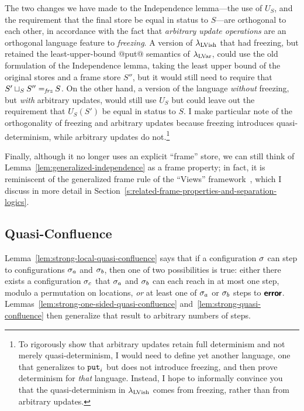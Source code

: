 \DefEqualStatus

The two changes we have made to the Independence lemma---the use of
$U_S$, and the requirement that the final store be equal in status to
$S$---are orthogonal to each other, in accordance with the fact that
\emph{arbitrary update operations} are an orthogonal language feature
to \emph{freezing}.  A version of $\lambda_{\textrm{LVish}}$ that had freezing,
but retained the least-upper-bound @put@ semantics of $\lambda_{\textrm{LVar}}$,
could use the old formulation of the Independence lemma, taking the
least upper bound of the original stores and a frame store $S''$, but
it would still need to require that $S' \sqcup_{S} S'' =_{\textit{frz}} S$.
On the other hand, a version of the language \emph{without} freezing,
but \emph{with} arbitrary updates, would still use $U_S$ but could
leave out the requirement that $U_S(S')$ be equal in status to $S$.  I
make particular note of the orthogonality of freezing and arbitrary
updates because freezing introduces quasi-determinism, while arbitrary
updates do not.\footnote{To rigorously show that arbitrary updates
  retain full determinism and not merely quasi-determinism, I would
  need to define yet another language, one that generalizes 
  to $\mbox{\texttt{put}}_i$ but does not introduce freezing, and then prove
  determinism for \emph{that} language.  Instead, I hope to informally
  convince you that the quasi-determinism in $\lambda_{\textrm{LVish}}$ comes from
  freezing, rather than from arbitrary updates.}

Finally, although it no longer uses an explicit ``frame'' store, we
can still think of Lemma~\ref{lem:generalized-independence} as a frame
property; in fact, it is reminiscent of the generalized frame rule of
the ``Views'' framework~\cite{views}, which I discuss in more detail
in Section~\ref{s:related-frame-properties-and-separation-logics}.

\subsection{Quasi-Confluence}\label{subsection:quasi-quasi-confluence}

Lemma~\ref{lem:strong-local-quasi-confluence} says that if a
configuration $\sigma$ can step to configurations $\sigma_a$ and
$\sigma_b$, then one of two possibilities is true: either there exists
a configuration $\sigma_c$ that $\sigma_a$ and $\sigma_b$ can each reach
in at most one step, modulo a permutation on locations, \emph{or} at
least one of $\sigma_a$ or $\sigma_b$ steps to $\textbf{\textsf{error}}$.
Lemmas~\ref{lem:strong-one-sided-quasi-confluence}
and~\ref{lem:strong-quasi-confluence} then generalize that result to
arbitrary numbers of steps.

